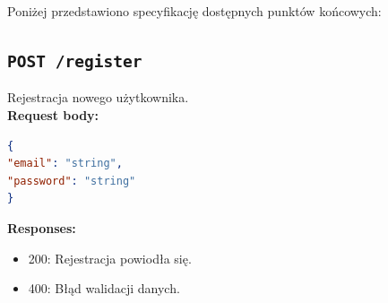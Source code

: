 Poniżej przedstawiono specyfikację dostępnych punktów końcowych:
\subsection{\texttt{POST /register}}
Rejestracja nowego użytkownika. \\
\textbf{Request body:}
\begin{lstlisting}[language=json]
{
"email": "string",
"password": "string"
}
\end{lstlisting}
\textbf{Responses:}
\begin{itemize}
\item 200: Rejestracja powiodła się.
\item 400: Błąd walidacji danych.
\end{itemize}
